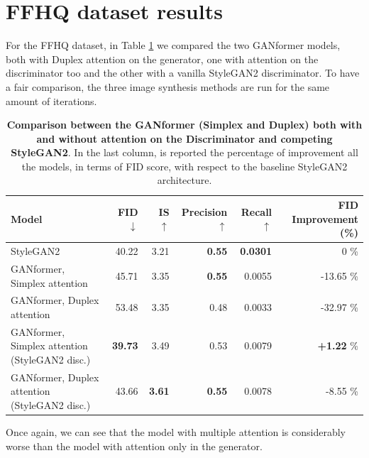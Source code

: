 \documentclass{article}
\begin{document}
\section{FFHQ dataset results}\label{sec:ffhq_results}
For the FFHQ dataset, in Table \ref{tab:results_ffhq} we compared the two GANformer models, both with Duplex attention on the generator, one with attention on the discriminator too and the other with a vanilla StyleGAN2 discriminator.
To have a fair comparison, the three image synthesis methods are run for the same amount of 
iterations.
\begin{table}[htb]
	\centering
	\caption{\textbf{Comparison between the GANformer (Simplex and Duplex) both with and without 
	attention on the Discriminator and competing StyleGAN2}. In the last column, is reported the percentage of improvement all the models, in terms of FID score, with respect to the baseline StyleGAN2 architecture.}
	\label{tab:results_ffhq}
	\vspace{3mm}
	\small
	\begin{tabular}{l|rrrrr}
		\toprule
		\textbf{Model}  & \textbf{FID $\downarrow$}  & \textbf{IS $\uparrow$} & 
		\textbf{Precision$\uparrow$}  & \textbf{Recall $\uparrow$} & \textbf{FID Improvement (\%)}\\ 
		\midrule
		StyleGAN2                    				&  {40.22} &  3.21 &  \textbf{0.55}&  \textbf{0.0301} & 0 \%\\ 
		GANformer, Simplex attention & 45.71 & 3.35 &  \textbf{0.55}  &  0.0055 & -13.65 \%\\ 
		GANformer, Duplex attention  & {53.48} & 3.35 & 0.48& 0.0033 & -32.97 \%\\ 
		GANformer, Simplex attention (StyleGAN2 disc.)  &   \textbf{39.73}  & 3.49  & 0.53  &  0.0079 &  \textbf{+1.22} \%\\ 
		GANformer, Duplex attention (StyleGAN2 disc.)  &  {43.66}  & \textbf{3.61} &   \textbf{0.55}   & {0.0078} & -{8.55} \%\\ 
		\bottomrule
	\end{tabular}
\end{table}

Once again, we can see that the model with multiple attention is considerably worse than the model with attention only in the generator. 
\end{document}

